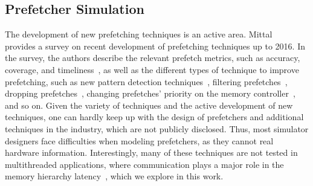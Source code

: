 \documentclass[AMA,final,STIX1COL]{WileyNJD-v2}
\newcommand{\ms}[1]{\textcolor{orange}{\bfseries \ul{ msserpa: #1} }\vspace{0.2cm}}
\newcommand{\fbm}[1]{\textcolor{red}{\bfseries \ul{fbm: #1} }\vspace{0.2cm}}
\begin{document}



\subsection{Prefetcher Simulation}

The development of new prefetching techniques is an active area.
Mittal~\cite{mittal2016survey} provides a survey on recent development of prefetching techniques up to 2016.
In the survey, the authors describe the relevant prefetch metrics, such as accuracy, coverage, and timeliness~\cite{srinath2007feedback}, as well as the different types of technique to improve prefetching, such as new pattern detection techniques~\cite{nesbit2004data}, filtering prefetches~\cite{zhuang2006reducing}, dropping prefetches~\cite{lee2008prefetcher}, changing prefetches' priority on the memory controller~\cite{ebrahimi2009coordinated}, and so on.
Given the variety of techniques and the active development of new techniques, one can hardly keep up with the design of prefetchers and additional techniques in the industry, which are not publicly disclosed.
Thus, most simulator designers face difficulties when modeling prefetchers, as they cannot real hardware information.
Interestingly, many of these techniques are not tested in multithreaded applications, where communication plays a major role in the memory hierarchy latency~\cite{jain2018rethinking,wu2019efficient,bhatia2019perceptron}, which we explore in this work.
\end{document}
